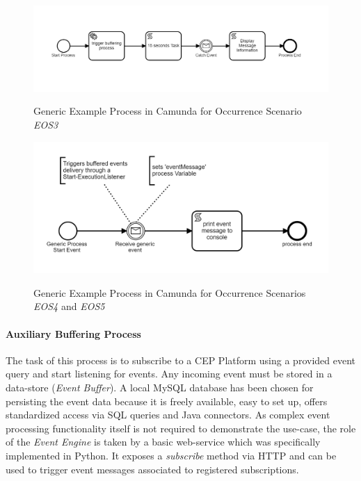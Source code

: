 \begin{figure}[]
	\myfloatalign
	{\includegraphics[width=1\linewidth]{chapters/assessment/example-o3.PNG}}
	\caption{Generic Example Process in Camunda for Occurrence Scenario \textit{EOS3}}\label{fig:camunda-example-o3}
\end{figure}

\begin{figure}[]
	\myfloatalign
	{\includegraphics[width=1\linewidth]{chapters/assessment/example-o4-o5.PNG}}
	\caption{Generic Example Process in Camunda for Occurrence Scenarios \textit{EOS4} and \textit{EOS5}}\label{fig:camunda-example-o4-o5}
\end{figure}

\paragraph{Auxiliary Buffering Process}
The task of this process is to subscribe to a CEP Platform using a provided event query and start listening for events. Any incoming event must be stored in a data-store (\textit{Event Buffer}).
A local MySQL database has been chosen for persisting the event data because it is freely available, easy to set up, offers standardized access via SQL queries and Java connectors.
As complex event processing functionality itself is not required to demonstrate the use-case, the role of the \textit{Event Engine} is taken by a basic web-service which was specifically implemented in Python. It exposes a \textit{subscribe} method via \acs{HTTP} and can be used to trigger event messages associated to registered subscriptions.

